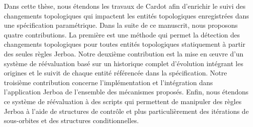 Dans cette thèse, nous étendons les travaux de Cardot afin d'enrichir le suivi des changements topologiques qui impactent les entités topologiques
enregistrées dans une spécification paramétrique. %
Dans la suite de ce manuscrit, nous proposons quatre
contributions. %
La première est une méthode qui permet la détection des changements
topologiques pour toutes entités topologiques statiquement à partir des seules
règles Jerboa. %
Notre deuxième contribution est la mise en \oe uvre d'un système de réévaluation basé sur un historique complet d'évolution intégrant les origines et le suivit de chaque entité référencée dans la spécification. Notre troisième contribution concerne l'implémentation et l'intégration dans l'application Jerboa de l'ensemble des mécanismes proposés. %
Enfin, nous étendons ce système de réévaluation à des scripts qui permettent de manipuler
 des règles Jerboa à l'aide de structures de contrôle et plus
particulièrement des itérations de sous-orbites et des structures
conditionnelles.%


